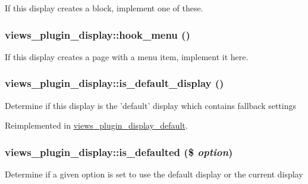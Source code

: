 If this display creates a block, implement one of these. \hypertarget{classviews__plugin__display_f81f784641ab255c20044ef3e70efd1d}{
\subsubsection[{hook\_\-menu}]{\setlength{\rightskip}{0pt plus 5cm}views\_\-plugin\_\-display::hook\_\-menu ()}}
\label{classviews__plugin__display_f81f784641ab255c20044ef3e70efd1d}


If this display creates a page with a menu item, implement it here. \hypertarget{classviews__plugin__display_4f4562c1d689d8d3494b78d676249732}{
\subsubsection[{is\_\-default\_\-display}]{\setlength{\rightskip}{0pt plus 5cm}views\_\-plugin\_\-display::is\_\-default\_\-display ()}}
\label{classviews__plugin__display_4f4562c1d689d8d3494b78d676249732}


Determine if this display is the 'default' display which contains fallback settings 

Reimplemented in \hyperlink{classviews__plugin__display__default_721b29f71ff0536dfcf28831e4b96e72}{views\_\-plugin\_\-display\_\-default}.\hypertarget{classviews__plugin__display_8f5676603ce803078ea100a5781bfbd6}{
\subsubsection[{is\_\-defaulted}]{\setlength{\rightskip}{0pt plus 5cm}views\_\-plugin\_\-display::is\_\-defaulted (\$ {\em option})}}
\label{classviews__plugin__display_8f5676603ce803078ea100a5781bfbd6}


Determine if a given option is set to use the default display or the current display

